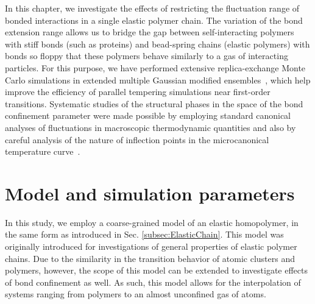 \documentclass[12pt]{report}
\begin{document}
In this chapter, we investigate the effects of restricting the fluctuation range of bonded interactions in a single elastic polymer chain. The variation of the bond extension range allows us to bridge the gap between self-interacting polymers with stiff bonds (such as proteins) and bead-spring chains (elastic polymers) with bonds so floppy that these polymers behave similarly to a gas of interacting particles. For this purpose, we have performed extensive replica-exchange Monte Carlo simulations in extended multiple Gaussian modified ensembles~\cite{Neuhaus2006}, which help improve the efficiency of parallel tempering simulations near first-order transitions. Systematic studies of the structural phases in the space of the bond confinement parameter were made possible by employing standard canonical analyses of fluctuations in macroscopic thermodynamic quantities and also by careful analysis of the nature of inflection points in the microcanonical temperature curve~\cite{Bachmann2014,Schnabel2011}.


\section{Model and simulation parameters}
In this study, we employ a coarse-grained model of an elastic homopolymer, in the same form as introduced in Sec.\,\,\ref{subsec:ElasticChain}. This model was originally introduced for investigations of general properties of elastic polymer chains. Due to the similarity in the transition behavior of atomic clusters and polymers, however, the scope of this model can be extended to investigate effects of bond confinement as well. As such, this model allows for the interpolation of systems ranging from polymers to an almost unconfined gas of atoms.
\end{document}
